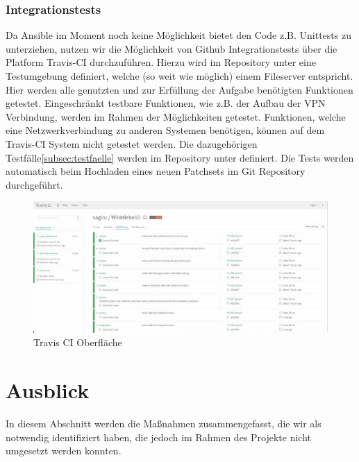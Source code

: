 \subsubsection{Integrationstests}
Da Ansible im Moment noch keine Möglichkeit bietet den Code z.B. Unittests zu unterziehen, nutzen wir die Möglichkeit von Github Integrationstests über die Platform Travis-CI durchzuführen. Hierzu wird im Repository unter \newline  {} eine Testumgebung definiert, welche (so weit wie möglich) einem Fileserver entspricht. Hier werden alle genutzten und zur Erfüllung der Aufgabe benötigten Funktionen getestet. Eingeschränkt testbare Funktionen, wie z.B. der Aufbau der VPN Verbindung, werden im Rahmen der Möglichkeiten getestet. Funktionen, welche eine Netzwerkverbindung zu anderen Systemen benötigen, können auf dem Travis-CI System nicht getestet werden. Die dazugehörigen Testfälle\ref{subsec:testfaelle} werden im Repository unter  definiert. Die Tests werden automatisch beim Hochladen eines neuen Patchsets im Git Repository durchgeführt.

\begin{figure}[!htbp]
	\centering
		\includegraphics[scale=0.75]{images/travisci.jpg}
	\caption{Travis CI Oberfläche}
	\label{img:travisci}
\end{figure}


\section{Ausblick}
\label{sec:ausblick}
In diesem Abschnitt werden die Maßnahmen zusammengefasst, die wir als notwendig identifiziert haben, die jedoch im Rahmen des Projekte nicht umgesetzt werden konnten.

